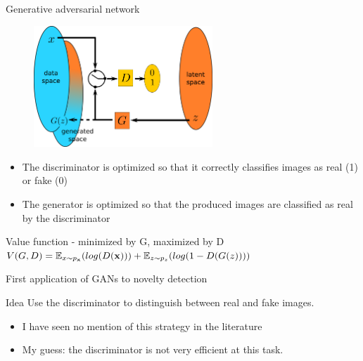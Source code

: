 \documentclass[xcolor=pdftex,dvipsnames,table,mathserif]{beamer}
\begin{document}
\begin{frame}{Generative adversarial network \cite{goodfellow_generative_2014}}

  \begin{figure}[ht]
    \centering
    \includegraphics[width=0.6\textwidth]{gan2}
  \end{figure}

  \begin{itemize}
  \item The discriminator is optimized so that it correctly classifies images as real (1) or fake (0)
  \item The generator is optimized so that the produced images are classified as real by the discriminator
  \end{itemize}

  \begin{block}{Value function - minimized by G, maximized by D}
    $V(G,D) = \mathbb{E}_{x \sim p_{\mathbf{x}}}(log(D(\mathbf{x}))) + \mathbb{E}_{z \sim p_z}(log(1 - D(G(z))))$
  \end{block}

\end{frame}


\begin{frame}{First application of GANs to novelty detection}

  \begin{block}{Idea}
    Use the discriminator to distinguish between real and fake images.
  \end{block}

  \begin{itemize}
  \item I have seen no mention of this strategy in the literature
  \item My guess: the discriminator is not very efficient at this task.
  \end{itemize}

\end{frame}
\end{document}
